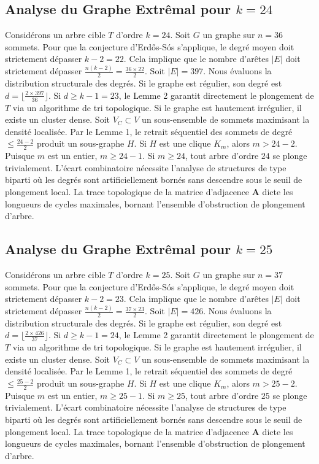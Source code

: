\documentclass[11pt,a4paper]{article}
\begin{document}
\subsection{Analyse du Graphe Extr\^emal pour $k=24$}
Consid\'erons un arbre cible $T$ d'ordre $k=24$.
Soit $G$ un graphe sur $n=36$ sommets.
Pour que la conjecture d'Erd\H{o}s-S\'os s'applique, le degr\'e moyen doit strictement d\'epasser $k-2 = 22$.
Cela implique que le nombre d'ar\^etes $|E|$ doit strictement d\'epasser $\frac{n(k-2)}{2} = \frac{36 \times 22}{2}$.
Soit $|E| = 397$.
Nous \'evaluons la distribution structurale des degr\'es. Si le graphe est r\'egulier, son degr\'e est $d = \lfloor \frac{2 \times 397}{36} \rfloor$.
Si $d \geq k-1 = 23$, le Lemme 2 garantit directement le plongement de $T$ via un algorithme de tri topologique.
Si le graphe est hautement irr\'egulier, il existe un cluster dense. Soit $V_C \subset V$ un sous-ensemble de sommets maximisant la densit\'e localis\'ee.
Par le Lemme 1, le retrait s\'equentiel des sommets de degr\'e $\leq \frac{24-2}{2}$ produit un sous-graphe $H$.
Si $H$ est une clique $K_{m}$, alors $m > 24-2$. Puisque $m$ est un entier, $m \geq 24-1$. Si $m \geq 24$, tout arbre d'ordre $24$ se plonge trivialement.
L'\'ecart combinatoire n\'ecessite l'analyse de structures de type biparti o\`u les degr\'es sont artificiellement born\'es sans descendre sous le seuil de plongement local. La trace topologique de la matrice d'adjacence $\mathbf{A}$ dicte les longueurs de cycles maximales, bornant l'ensemble d'obstruction de plongement d'arbre.


\subsection{Analyse du Graphe Extr\^emal pour $k=25$}
Consid\'erons un arbre cible $T$ d'ordre $k=25$.
Soit $G$ un graphe sur $n=37$ sommets.
Pour que la conjecture d'Erd\H{o}s-S\'os s'applique, le degr\'e moyen doit strictement d\'epasser $k-2 = 23$.
Cela implique que le nombre d'ar\^etes $|E|$ doit strictement d\'epasser $\frac{n(k-2)}{2} = \frac{37 \times 23}{2}$.
Soit $|E| = 426$.
Nous \'evaluons la distribution structurale des degr\'es. Si le graphe est r\'egulier, son degr\'e est $d = \lfloor \frac{2 \times 426}{37} \rfloor$.
Si $d \geq k-1 = 24$, le Lemme 2 garantit directement le plongement de $T$ via un algorithme de tri topologique.
Si le graphe est hautement irr\'egulier, il existe un cluster dense. Soit $V_C \subset V$ un sous-ensemble de sommets maximisant la densit\'e localis\'ee.
Par le Lemme 1, le retrait s\'equentiel des sommets de degr\'e $\leq \frac{25-2}{2}$ produit un sous-graphe $H$.
Si $H$ est une clique $K_{m}$, alors $m > 25-2$. Puisque $m$ est un entier, $m \geq 25-1$. Si $m \geq 25$, tout arbre d'ordre $25$ se plonge trivialement.
L'\'ecart combinatoire n\'ecessite l'analyse de structures de type biparti o\`u les degr\'es sont artificiellement born\'es sans descendre sous le seuil de plongement local. La trace topologique de la matrice d'adjacence $\mathbf{A}$ dicte les longueurs de cycles maximales, bornant l'ensemble d'obstruction de plongement d'arbre.
\end{document}
